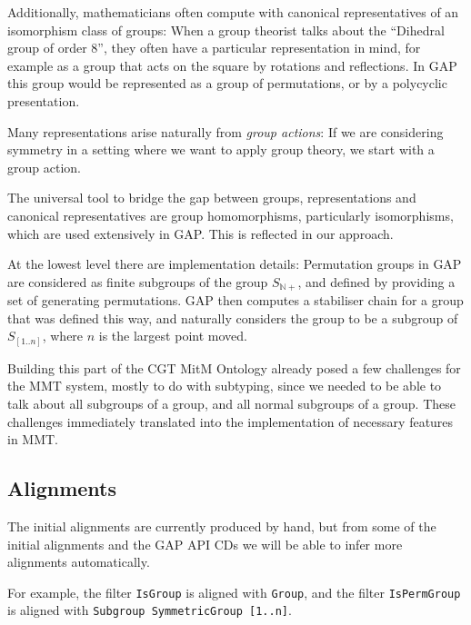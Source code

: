 Additionally, mathematicians often compute with canonical representatives of an
isomorphism class of groups: When a group theorist talks about the ``Dihedral
group of order 8'', they often have a particular representation in
mind, for example as a group that acts on the square by rotations
and reflections. In GAP this group would be represented as a group of
permutations, or by a polycyclic presentation.

Many representations arise naturally from \emph{group actions}: If we are
considering symmetry in a setting where we want to apply group theory, we start
with a group action.

The universal tool to bridge the gap between groups, representations and
canonical representatives are group homomorphisms, particularly isomorphisms,
which are used extensively in GAP. This is reflected in our approach.

\smallskip

At the lowest level there are implementation details: Permutation groups in GAP
are considered as finite subgroups of the group $S_{\mathbb{N}+}$, and defined by
providing a set of generating permutations. GAP then computes a stabiliser chain
for a group that was defined this way, and naturally considers the group to be a
subgroup of $S_{[1..n]}$, where $n$ is the largest point moved.

\smallskip

Building this part of the CGT MitM Ontology already posed a few challenges for
the MMT system, mostly to do with subtyping, since we needed to be able to talk
about all subgroups of a group, and all normal subgroups of a group.
These challenges immediately translated into the implementation of necessary
features in MMT.

\subsection{Alignments}

The initial alignments are currently produced by hand, but from some of the
initial alignments and the GAP API CDs we will be able to infer more alignments
automatically.

For example, the filter \texttt{IsGroup} is aligned with \texttt{Group}, and the
filter \texttt{IsPermGroup} is aligned with \texttt{Subgroup SymmetricGroup
  [1..n]}.

